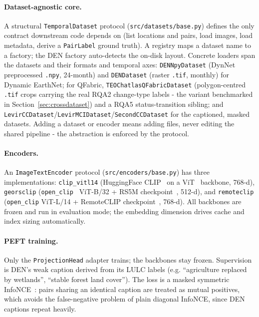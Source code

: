 \documentclass{article}
\begin{document}
\paragraph{Dataset-agnostic core.}
A structural \texttt{TemporalDataset} protocol
(\texttt{src/datasets/base.py}) defines the only contract downstream code
depends on (list locations and pairs, load images, load metadata, derive a
\texttt{PairLabel} ground truth). A registry maps a dataset name to a factory;
the DEN factory auto-detects the on-disk layout. Concrete loaders span the
datasets and their formats and temporal axes: \texttt{DENNpyDataset} (DynNet
preprocessed \texttt{.npy}, 24-month) and \texttt{DENDataset} (raster
\texttt{.tif}, monthly) for Dynamic EarthNet; for QFabric,
\texttt{TEOChatlasQFabricDataset} (polygon-centred \texttt{.tif} crops carrying
the real RQA2 change-type labels - the variant benchmarked in
Section~\ref{sec:crossdataset}) and a RQA5 status-transition
sibling; and \texttt{LevirCCDataset}/\texttt{LevirMCIDataset}/\texttt{SecondCCDataset}
for the captioned, masked datasets. Adding a dataset or encoder means adding
files, never editing the shared pipeline - the abstraction is enforced by the
protocol.

\paragraph{Encoders.}
An \texttt{ImageTextEncoder} protocol (\texttt{src/encoders/base.py}) has three
implementations: \texttt{clip\_vitl14} (HuggingFace CLIP~\cite{clip} on a
ViT~\cite{vit} backbone, 768-d), \texttt{georsclip}
(\texttt{open\_clip}~\cite{openclip} ViT-B/32 + RS5M checkpoint~\cite{georsclip},
512-d), and \texttt{remoteclip} (\texttt{open\_clip} ViT-L/14 + RemoteCLIP
checkpoint~\cite{remoteclip}, 768-d). All backbones are frozen and run in
evaluation mode; the embedding dimension drives cache and index sizing
automatically.

\paragraph{PEFT training.}
Only the \texttt{ProjectionHead} adapter trains; the backbones stay frozen.
Supervision is DEN's weak caption derived from its LULC labels
(e.g. ``agriculture replaced by wetlands'', ``stable forest land cover''). The
loss is a masked symmetric InfoNCE~\cite{infonce}: pairs sharing an identical
caption are treated as mutual positives, which avoids the false-negative problem
of plain diagonal InfoNCE, since DEN captions repeat heavily.
\end{document}
